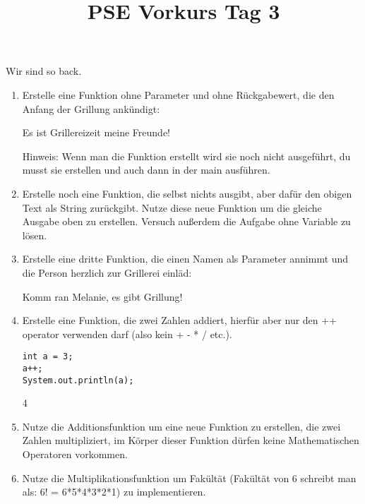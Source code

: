 \documentclass{../../sheet}
\title{PSE Vorkurs Tag 3}
\begin{document}
\maketitle
Wir sind so back.

\newpage


\begin{enumerate}
    \item Erstelle eine Funktion ohne Parameter und ohne Rückgabewert, die den Anfang der Grillung ankündigt:
    \begin{ausgabe}
Es ist Grillereizeit meine Freunde!
    \end{ausgabe}
    Hinweis: Wenn man die Funktion erstellt wird sie noch nicht ausgeführt, du musst sie erstellen und auch dann in der main ausführen.
    \item Erstelle noch eine Funktion, die selbst nichts ausgibt, aber dafür den obigen Text als String zurückgibt. Nutze diese neue Funktion um die gleiche Ausgabe oben zu erstellen. Versuch außerdem die Aufgabe ohne Variable zu lösen.
    \item Erstelle eine dritte Funktion, die einen Namen als Parameter annimmt und die Person herzlich zur Grillerei einläd:
    \begin{ausgabe}
Komm ran Melanie, es gibt Grillung!
    \end{ausgabe}
    \item Erstelle eine Funktion, die zwei Zahlen addiert, hierfür aber nur den ++ operator verwenden darf (also kein + - * / etc.). 
    \begin{verbatim}
int a = 3;
a++;
System.out.println(a);
    \end{verbatim}
    \begin{ausgabe}
        4
    \end{ausgabe}
    \item Nutze die Additionsfunktion um eine neue Funktion zu erstellen, die zwei Zahlen multipliziert, im Körper dieser Funktion dürfen keine Mathematischen Operatoren vorkommen.
    \item Nutze die Multiplikationsfunktion um Fakültät (Fakültät von 6 schreibt man als: 6! = 6*5*4*3*2*1) zu implementieren.
\end{enumerate}

\newpage
{}
\end{document}
